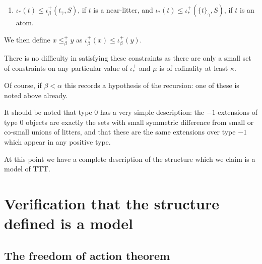 \documentclass[112pt]{article}
\begin{document}
\begin{description}
\begin{enumerate}
\item $\iota_*(t) \leq \iota^+_\beta(t_\gamma,S)$, if $t$ is a near-litter,  and  $\iota_*(t) \leq \iota^+_*(\{t\}_\gamma,S)$, if $t$ is an atom.

\end{enumerate}

We then define $x \leq^+_\beta y$ as $\iota^+_\beta(x) \leq \iota^+_\beta(y)$.

There is no difficulty in satisfying these constraints as there are only a small set of constraints on any particular value of $\iota_*^+$ and $\mu$ is of cofinality at least $\kappa$.

Of course, if $\beta<\alpha$ this records a hypothesis of the recursion:  one of these is noted above already.


   It should be noted that type 0 has a very simple description:  the $-1$-extensions of type 0 objects are exactly the sets with small symmetric difference from small or co-small unions of litters, and that these are the same extensions over type $-1$ which appear in any positive type.


At this point we have a complete description of the structure which we claim is a model of TTT.


\end{description}

\section{Verification that the structure defined is a model}

\subsection{The freedom of action theorem}
\end{document}

